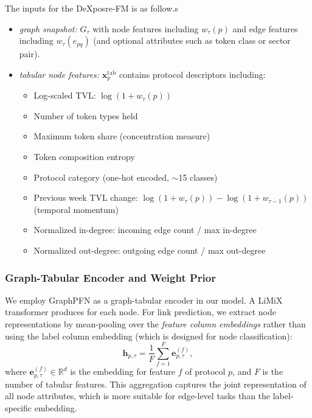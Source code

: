 

The inputs for the DeXposre-FM is as follow.s
\begin{itemize}
  \item \emph{graph snapshot:} $G_{\tau}$ with node features including $w_{\tau}(p)$ and edge features including $w_{\tau}(e_{pq})$ (and optional attributes such as token class or sector pair).
  \item \emph{tabular node features:} $\mathbf{x}^{\mathrm{tab}}_{p}$ contains protocol descriptors including:
  \begin{itemize}
    \item Log-scaled TVL: $\log(1 + w_{\tau}(p))$
    \item Number of token types held
    \item Maximum token share (concentration measure)
    \item Token composition entropy
    \item Protocol category (one-hot encoded, $\sim$15 classes)
    \item Previous week TVL change: $\log(1 + w_{\tau}(p)) - \log(1 + w_{\tau-1}(p))$ (temporal momentum)
    \item Normalized in-degree: incoming edge count / max in-degree
    \item Normalized out-degree: outgoing edge count / max out-degree
  \end{itemize}
\end{itemize}

\subsubsection{Graph-Tabular Encoder and Weight Prior}
We employ GraphPFN \cite{eremeev2025turningtabularfoundationmodels} %
as a graph-tabular encoder in our model. %
A LiMiX transformer %
produces %
for each node. For link prediction, we extract node representations by mean-pooling %
over the \textit{feature column embeddings} %
rather than using the label column embedding %
(which is designed for node classification):
\begin{equation}
\mathbf{h}_{p,\tau} = \frac{1}{F}\sum_{f=1}^{F} \mathbf{e}_{p,\tau}^{(f)},
\end{equation}
where $\mathbf{e}_{p,\tau}^{(f)}\in\mathbb{R}^d$ is the embedding for feature $f$ of protocol $p$, and $F$ is the number of tabular features. This aggregation captures the joint representation of all node attributes, which is more suitable for edge-level tasks than the label-specific embedding.

